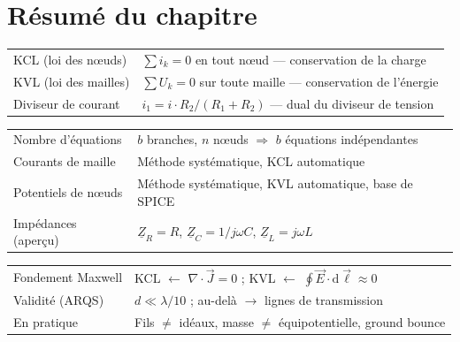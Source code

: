 \documentclass[12pt,a4paper,twoside]{book}
\begin{document}
\section*{Résumé du chapitre}

\begin{bases}[title={\color{white} Résumé --- Les Bases}]
\begin{center}
\renewcommand{\arraystretch}{1.3}
\begin{tabular}{p{4.5cm}p{8.5cm}}
\toprule
KCL (loi des n\oe uds) & $\sum i_k = 0$ en tout n\oe ud --- conservation de la charge \\
KVL (loi des mailles) & $\sum U_k = 0$ sur toute maille --- conservation de l'énergie \\
Diviseur de courant & $i_1 = i \cdot R_2/(R_1+R_2)$ --- dual du diviseur de tension \\
\bottomrule
\end{tabular}
\end{center}
\end{bases}

\begin{approfondissement}[title={\color{white} Résumé --- Approfondissement}]
\begin{center}
\renewcommand{\arraystretch}{1.3}
\begin{tabular}{p{4.5cm}p{8.5cm}}
\toprule
Nombre d'équations & $b$ branches, $n$ n\oe uds $\Rightarrow$ $b$ équations indépendantes \\
Courants de maille & Méthode systématique, KCL automatique \\
Potentiels de n\oe uds & Méthode systématique, KVL automatique, base de SPICE \\
Impédances (aperçu) & $\underline{Z}_R = R$, $\underline{Z}_C = 1/j\omega C$, $\underline{Z}_L = j\omega L$ \\
\bottomrule
\end{tabular}
\end{center}
\end{approfondissement}

\begin{ingenieur}[title={\color{white} Résumé --- Niveau Ingénieur}]
\begin{center}
\renewcommand{\arraystretch}{1.3}
\begin{tabular}{p{4.5cm}p{8.5cm}}
\toprule
Fondement Maxwell & KCL $\leftarrow$ $\nabla\cdot\vec{J}=0$ ; KVL $\leftarrow$ $\oint\vec{E}\cdot\mathrm{d}\vec{\ell} \approx 0$ \\
Validité (ARQS) & $d \ll \lambda/10$ ; au-delà $\to$ lignes de transmission \\
En pratique & Fils $\neq$ idéaux, masse $\neq$ équipotentielle, ground bounce \\
\bottomrule
\end{tabular}
\end{center}
\end{ingenieur}
\end{document}
